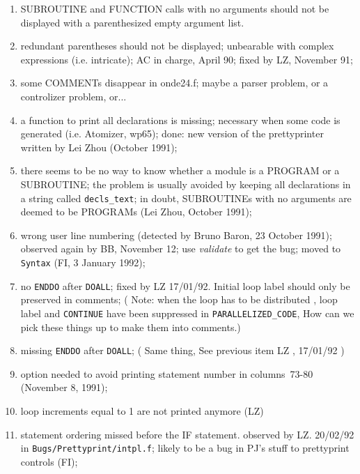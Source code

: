 \begin{enumerate}

  \item SUBROUTINE and FUNCTION calls with no arguments should not be
	displayed with a parenthesized empty argument list.

  \item redundant parentheses should not be displayed; unbearable with
	complex expressions (i.e. intricate); 
	AC in charge, April 90; fixed by LZ, November 91;

  \item some COMMENTs disappear in onde24.f; maybe a parser problem,
	or a controlizer problem, or...

  \item a function to print all declarations is missing; necessary when some
	code is generated (i.e. Atomizer, wp65); done: new version of the
	prettyprinter written by Lei Zhou (October 1991);

  \item there seems to be no way to know whether a module is a PROGRAM
	or a SUBROUTINE; the problem is usually avoided by keeping all
	declarations in a string called \verb+decls_text+; in doubt,
	SUBROUTINEs with no arguments are deemed to be PROGRAMs (Lei Zhou,
	October 1991);

  \item wrong user line numbering (detected by Bruno Baron, 23 October 1991);
	observed again by BB, November 12; use {\em validate} to get
	the bug; moved to \verb+Syntax+ (FI, 3 January 1992);

  \item {}
	no \verb+ENDDO+ after \verb+DOALL+; fixed by LZ 17/01/92. 
	Initial loop label should only be preserved in comments;
	( Note: when the loop has to be distributed , loop label and
	\verb+CONTINUE+ have been suppressed in 
	\verb+PARALLELIZED_CODE+, How can
	we pick these things up to make them into comments.)

  \item {} missing \verb+ENDDO+ after \verb+DOALL+;
	( Same thing, See previous item LZ , 17/01/92 )

  \item {} option needed to avoid printing statement number in
	columns~73-80 (November 8, 1991);

  \item loop increments equal to 1 are not printed anymore (LZ)

  \item statement ordering missed before the IF statement.
	observed by LZ. 20/02/92 in \verb+Bugs/Prettyprint/intpl.f+;
	likely to be a bug in PJ's stuff to prettyprint controls (FI);


\end{enumerate}
